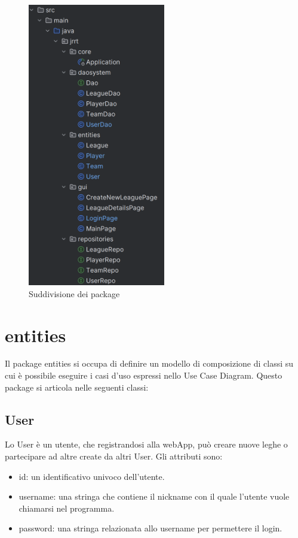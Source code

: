 \documentclass[twoside,openright,titlepage,fleqn,headinclude,12pt,a4paper,BCOR=5mm,footinclude]{scrbook}
\begin{document}
\begin{figure}[H]
  \centering
  \includegraphics[width=60mm]{images/codeStruct.png}
  \caption{Suddivisione dei package}
  \label{fig:codeStructure}
\end{figure}

\section{entities}
Il package entities si occupa di definire un modello di composizione di classi su cui è possibile eseguire i casi d’uso espressi nello Use Case Diagram. Questo package si articola nelle
seguenti classi:

\subsection{User}
Lo User è un utente, che registrandosi alla webApp, può creare nuove leghe o partecipare ad altre create da altri User. Gli attributi sono:

\begin{itemize}
    \item id: un identificativo univoco dell'utente.
    \item username: una stringa che contiene il nickname con il quale l'utente vuole chiamarsi nel programma.
    \item password: una stringa relazionata allo username per permettere il login.
\end{itemize}
\end{document}
